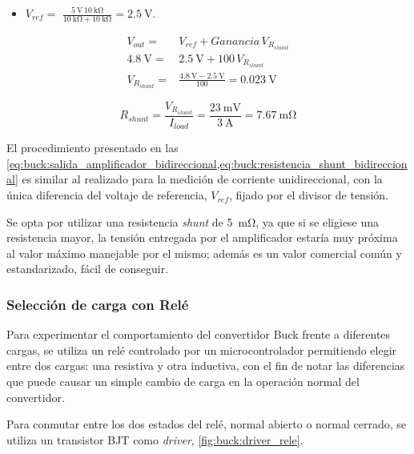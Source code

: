 \begin{itemize}[noitemsep]
    \item $V_{ref} =$ $\frac{\SI{5}{\volt} \, \SI{10}{\kilo\ohm}}{\SI{10}{\kilo\ohm} + \SI{10}{\kilo\ohm}} = \SI{2.5}{\volt}$.
\end{itemize}

\begin{align} \label{eq:buck:salida_amplificador_bidireccional}
    V_{out} =& V_{ref} + Ganancia \, V_{R_{shunt}} \\
    \SI{4.8}{\volt} =& \SI{2,5}{\volt} + 100 \, V_{R_{shunt}} \nonumber \\
    V_{R_{shunt}} =& \frac{\SI{4.8}{\volt} - \SI{2.5}{\volt}}{100} = \SI{0.023}{\volt} \nonumber
\end{align}

\begin{equation} \label{eq:buck:resistencia_shunt_bidireccional}
    R_{shunt} = \frac{V_{R_{shunt}}}{I_{load}} = \frac{\SI{23}{\milli\volt}}{\SI{3}{\ampere}} = \SI{7,67}{\milli\ohm}
\end{equation}

El procedimiento presentado en las \cref{eq:buck:salida_amplificador_bidireccional,eq:buck:resistencia_shunt_bidireccional} es similar al realizado para la medición de corriente unidireccional, con la única diferencia del voltaje de referencia, $V_{ref}$, fijado por el divisor de tensión.

Se opta por utilizar una resistencia \textit{shunt} de \SI{5}{\milli\ohm}, ya que si se eligiese una resistencia mayor, la tensión entregada por el amplificador estaría muy próxima al valor máximo manejable por el mismo; además es un valor comercial común y estandarizado, fácil de conseguir.

\subsubsection{Selección de carga con Relé}

Para experimentar el comportamiento del convertidor Buck frente a diferentes cargas, se utiliza un relé controlado por un microcontrolador permitiendo elegir entre dos cargas: una resistiva y otra inductiva, con el fin de notar las diferencias que puede causar un simple cambio de carga en la operación normal del convertidor.

Para conmutar entre los dos estados del relé, normal abierto o normal cerrado, se utiliza un transistor BJT como \textit{driver}, \cref{fig:buck:driver_rele}.

